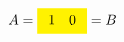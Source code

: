 \documentclass{article}
\begin{document}
\begin{align*}
A=\colorbox{yellow}{$\begin{array}{cc}1 &0\end{array}$}&=B
\end{align*}
\end{document}
